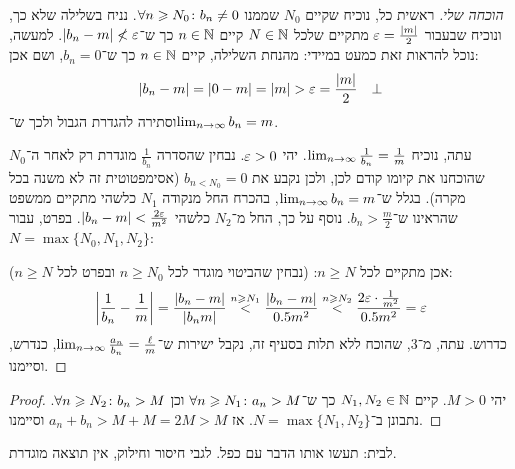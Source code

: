 \documentclass[name=רשימות חשבון דיפרנציאלי ואינטגרלי 1א]{../../../tex/classes/megasumPreamble}
\begin{document}
\begin{enumerate}
\begin{proof}[הוכחה שלי]
			ראשית כל, נוכיח שקיים $N_0$ שממנו $\forall n \geqslant N_0 \colon b_n \neq 0$. נניח בשלילה שלא כך, ונוכיח שבעבור $\eg = \frac{\sof m}{2}$ מתקיים שלכל $N \in \mathbb{N}$ קיים $n \in \mathbb{N}$ כך ש־$\sof{b_n - m}  \not < \eg$. למעשה, נוכל להראות זאת כמעט במיידי: מהנחת השלילה, קיים $n \in \mathbb{N}$ כך ש־$b_n = 0$, ושם אכן:
			\[ \sof{b_n - m} = \sof{0 - m} = \sof m > \eg = \frac{\sof m}{2} \quad \bot \]
			וסתירה להגדרת הגבול ולכך ש־$\lim_{n \to \infty} b_n = m$.

			עתה, נוכיח $\lim_{n \to \infty} \frac{1}{b_n} = \frac{1}{m}$. יהי $\eg > 0$. נבחין שהסדרה $\frac{1}{b_n}$ מוגדרת רק לאחר ה־$N_0$ שהוכחנו את קיומו קודם לכן, ולכן נקבע את $b_{n < N_0} = 0$ (אסימפטוטית זה לא משנה בכל מקרה). בגלל ש־$\lim_{n \to \infty} b_n = m$, בהכרח החל מנקודה $N_1$ כלשהי מתקיים ממשפט שהראינו ש־$b_n > \frac{m}{2}$. נוסף על כך, החל מ־$N_2$ כלשהי $\sof{b_n - m} < \frac{2\eg}{m^2}$. בפרט, עבור $N = \max\{N_0, N_1, N_2\}$:

			אכן מתקיים לכל $n \ge N$: (נבחין שהביטוי מוגדר לכל $n \ge N_0$ ובפרט לכל $n \ge N$):
			\[ \sof{\frac{1}{b_n} - \frac{1}{m}} = \frac{\sof{b_n - m}}{\sof{b_nm}} \overset{n \ge N_1}{<} \frac{\sof{b_n - m}}{0.5m^2} \overset{n \ge N_2}{<} \frac{2\eg \cdot \frac{1}{m^2}}{0.5m^2} = \eg \]
			כדרוש. עתה, מ־3, שהוכח ללא תלות בסעיף זה, נקבל ישירות ש־$\lim_{n \to \infty} \frac{a_n}{b_n} = \frac{\ell}{m}$, כנדרש, וסיימנו.
		\end{proof}
	\end{enumerate}


	\begin{proof}
		יהי $M > 0$. קיים $N_1, N_2 \in \mathbb{N}$ כך ש־$\forall n \geqslant N_1 \colon a_n > M$ וכן $\forall n \geqslant N_2\colon b_n > M$. נתבונן ב־$N = \max\{N_1, N_2\}$. אז $a_n + b_n > M + M = 2M > M$ וסיימנו.
	\end{proof}
	לבית: תעשו אותו הדבר עם כפל. לגבי חיסור וחילוק, אין תוצאה מוגדרת.
	
\end{document}
